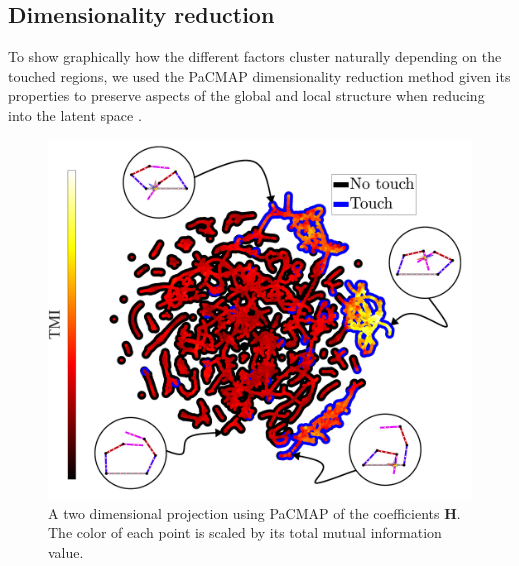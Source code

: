 \subsection{Dimensionality reduction}
To show graphically how the different factors cluster naturally depending on the touched regions, we used the PaCMAP dimensionality reduction method \cite{Wang2021Understandinghowdimension} given its properties to preserve aspects of the global and local structure when reducing into the latent space \cite{Huang2022Towardscomprehensiveevaluation}.

\begin{figure}[!th]
	\centering
	\includegraphics[width=0.99\columnwidth]{fig/pacmac_with_timi_and_modes.pdf}
	\caption{A two dimensional projection using PaCMAP of the coefficients $\bm{H}$. The color of each point is scaled by its total mutual information value.}
	\label{fig:pacmac_with_timi_and_modes}
\end{figure}

